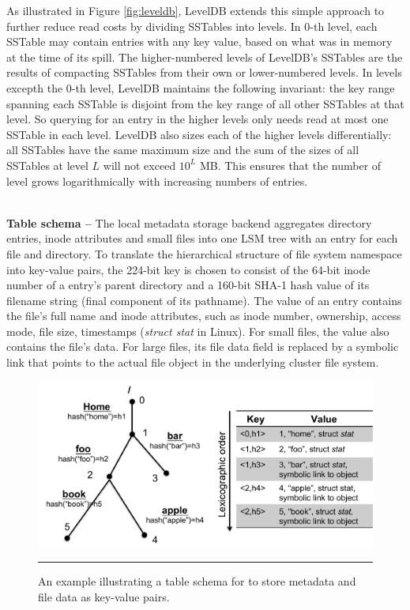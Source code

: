 As illustrated in Figure \ref{fig:leveldb},
LevelDB extends this simple approach to further
reduce read costs by dividing SSTables into levels.
In 0-th level, each SSTable may contain entries with any key value,
based on what was in memory at the time of its spill.
The higher-numbered levels of LevelDB's SSTables are
the results of compacting SSTables from their own or lower-numbered levels.
In levels excepth the 0-th level, LevelDB maintains the following invariant:
the key range spanning each SSTable is disjoint from
the key range of all other SSTables at that level.
So querying for an entry in the higher levels
only needs read at most one SSTable in each level.
LevelDB also sizes each of the higher levels differentially:
all SSTables have the same maximum size and
the sum of the sizes of all SSTables at level $L$ will not exceed $10^L$ MB.
This ensures that the number of level grows
logarithmically with increasing numbers of entries.

~\\
\textbf{Table schema -- }
The local metadata storage backend aggregates directory entries,
inode attributes and small files into one LSM tree
with an entry for each file and directory.
To translate the hierarchical structure of file system namespace
into key-value pairs, the 224-bit key is chosen to consist of
the 64-bit inode number of a entry's parent directory
and a 160-bit SHA-1 hash value of its filename string
(final component of its pathname).
The value of an entry contains the file's full name and inode attributes,
such as inode number, ownership, access mode, file size, timestamps (\textit{struct stat} in Linux).
For small files, the value also contains the file's data.
For large files, its file data field is replaced by a symbolic link
that points to the actual file object in the underlying cluster file system.

\begin{figure}[t]
\centering
\includegraphics[scale=0.4]{figs/schema}
\caption{\normalsize
An example illustrating a table schema for \tfs
to store metadata and file data as key-value pairs.
}
\vspace{10pt}
\hrule
\label{fig:schema}
\end{figure}

